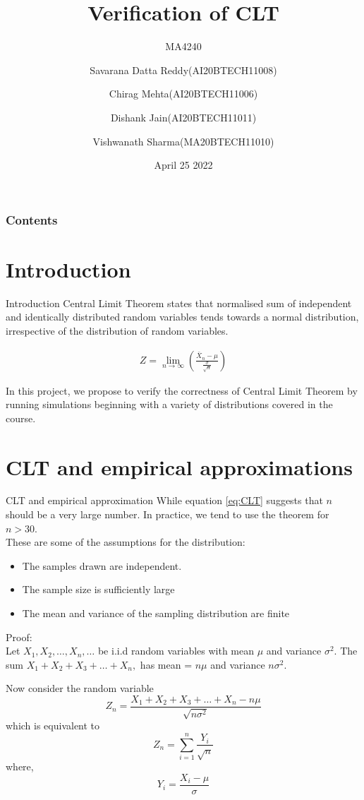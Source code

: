 \documentclass[10pt]{beamer}
\title{Verification of CLT}
\subtitle{MA4240}
\author[]{ Savarana Datta Reddy(AI20BTECH11008)  \and Chirag Mehta(AI20BTECH11006)\\
\and Dishank Jain(AI20BTECH11011) \and Vishwanath Sharma(MA20BTECH11010)}
\institute{IIT Hyderabad}
\date{April 25 2022}
\begin{document}
\frame{\titlepage}
\begin{frame}
\frametitle{Contents}
\tableofcontents
\end{frame}
\section{Introduction}
\begin{frame}{Introduction}
Central Limit Theorem states that normalised sum of independent and identically distributed random variables tends towards a normal distribution, irrespective of the distribution of random variables.
\begin{block}

\begin{align}
    Z = \lim_{n \to \infty} \left(\frac{\bar{X}_n-\mu}{\frac{\sigma}{\sqrt{n}}}\right) \label{eq:CLT}
\end{align}
\end{block}

In this project, we propose to verify the correctness of Central Limit Theorem by running simulations beginning with a variety of distributions covered in the course.
\end{frame}


\section{CLT and empirical approximations}
\begin{frame}{CLT and empirical approximation}
    While equation \eqref{eq:CLT} suggests that $n$ should be a very large number. In practice, we tend to use the theorem for $n>30$.\\
These are some of the assumptions for the distribution:
\begin{itemize}
\item  The samples drawn are independent.
\item  The sample size is sufficiently large
\item  The mean and variance of the sampling distribution are finite
\end{itemize}
\end{frame}
\begin{frame}{}
Proof:\\
Let $X_1,X_2,\dots,X_n,\dots$ be i.i.d random variables with mean $\mu$ and variance $\sigma^2$.
The sum $X_1+X_2+X_3+\dots+X_n,$ has mean = $n\mu$ and variance $n\sigma^2$.

Now consider the random variable 
\begin{equation}
    Z_n = \frac{X_1+X_2+X_3+\dots+X_n - n\mu}{\sqrt{n\sigma^2}}
\end{equation}
which is equivalent to 
\begin{equation}
    Z_n = \sum_{i=1}^n \frac{Y_i}{\sqrt{n}}
\end{equation}
where,
\begin{equation}
    Y_i = \frac{X_i-\mu}{\sigma}\label{a}
\end{equation}
\end{frame}
\end{document}
